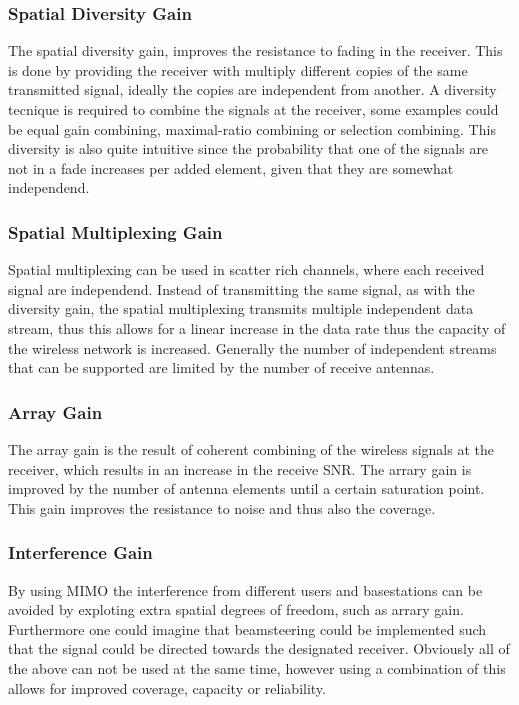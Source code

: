 \subsubsection{Spatial Diversity Gain}
The spatial diversity gain, improves the resistance to fading in the receiver. This is done by providing the receiver with multiply different copies of the same transmitted signal, ideally the copies are independent from another. A diversity tecnique is required to combine the signals at the receiver\cite{Ezio2007MIMO}, some examples could be equal gain combining, maximal-ratio combining or selection combining. This diversity is also quite intuitive since the probability that one of the signals are not in a fade increases per added element, given that they are somewhat independend. 
 
\subsubsection{Spatial Multiplexing Gain}
Spatial multiplexing can be used in scatter rich channels, where each received signal are independend. Instead of transmitting the same signal, as with the diversity gain, the spatial multiplexing transmits multiple independent data stream, thus this allows for a linear increase in the data rate thus the capacity of the wireless network is increased. Generally the number of independent streams that can be supported are limited by the number of receive antennas. 

\subsubsection{Array Gain}
The array gain is the result of coherent combining of the wireless signals at the receiver, which results in an increase in the receive SNR. The arrary gain is improved by the number of antenna elements until a certain saturation point. This gain improves the resistance to noise and thus also the coverage. 
  
\subsubsection{Interference Gain}
By using MIMO the interference from different users and basestations can be avoided by exploting extra spatial degrees of freedom, such as arrary gain. Furthermore one could imagine that beamsteering could be implemented such that the signal could be directed towards the designated receiver. Obviously all of the above can not be used at the same time, however using a combination of this allows for improved coverage, capacity or reliability.
 
